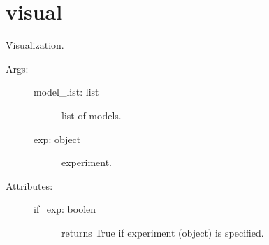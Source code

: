 \documentclass[letterpaper,10pt,english]{sphinxmanual}
\begin{document}
\section{visual}
\label{\detokenize{modules/visual:module-phlab.visual}}\label{\detokenize{modules/visual:visual}}\label{\detokenize{modules/visual::doc}}

\begin{fulllineitems}
\label{\detokenize{modules/visual:phlab.visual.plot}}
Visualization.
\begin{description}
\item[{Args:}] \leavevmode\begin{description}
\item[{model\_list: list}] \leavevmode
list of models.

\item[{exp: object}] \leavevmode
experiment.

\end{description}

\item[{Attributes:}] \leavevmode\begin{description}
\item[{if\_exp: boolen}] \leavevmode
returns True if experiment (object) is specified.

\end{description}

\end{description}

\end{fulllineitems}



\renewcommand{\indexname}{Python Module Index}
\begin{sphinxtheindex}
\let\bigletter\sphinxstyleindexlettergroup
\bigletter{p}
\item\relax{}
\item\relax{}
\item\relax{}
\item\relax{}
\end{sphinxtheindex}

\renewcommand{\indexname}{Index}
\printindex
\end{document}
